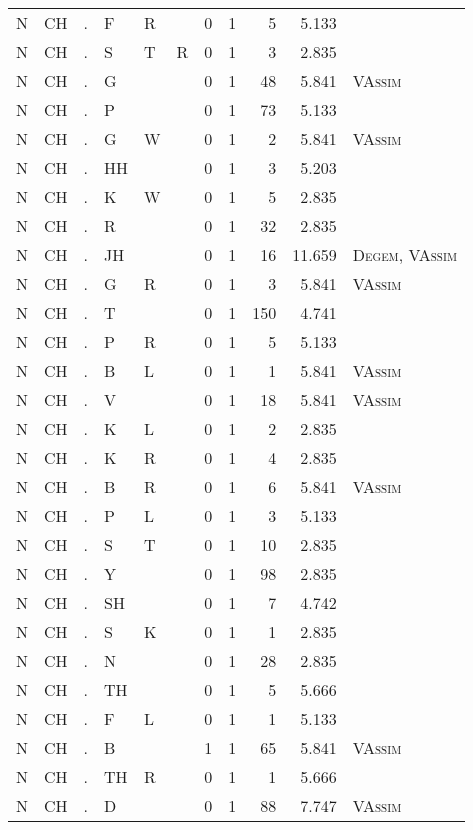 \begin{longtable}{r@{ } r@{ } c@{ } l@{ } l@{ } l@{ } r r r r l }
N & CH & . & F & R &  & 0 & 1 & 5 & 5.133 &  \\
N & CH & . & S & T & R & 0 & 1 & 3 & 2.835 &  \\
N & CH & . & G &  &  & 0 & 1 & 48 & 5.841 & \textsc{VAssim} \\
N & CH & . & P &  &  & 0 & 1 & 73 & 5.133 &  \\
N & CH & . & G & W &  & 0 & 1 & 2 & 5.841 & \textsc{VAssim} \\
N & CH & . & HH &  &  & 0 & 1 & 3 & 5.203 &  \\
N & CH & . & K & W &  & 0 & 1 & 5 & 2.835 &  \\
N & CH & . & R &  &  & 0 & 1 & 32 & 2.835 &  \\
N & CH & . & JH &  &  & 0 & 1 & 16 & 11.659 & \textsc{Degem}, \textsc{VAssim} \\
N & CH & . & G & R &  & 0 & 1 & 3 & 5.841 & \textsc{VAssim} \\
N & CH & . & T &  &  & 0 & 1 & 150 & 4.741 &  \\
N & CH & . & P & R &  & 0 & 1 & 5 & 5.133 &  \\
N & CH & . & B & L &  & 0 & 1 & 1 & 5.841 & \textsc{VAssim} \\
N & CH & . & V &  &  & 0 & 1 & 18 & 5.841 & \textsc{VAssim} \\
N & CH & . & K & L &  & 0 & 1 & 2 & 2.835 &  \\
N & CH & . & K & R &  & 0 & 1 & 4 & 2.835 &  \\
N & CH & . & B & R &  & 0 & 1 & 6 & 5.841 & \textsc{VAssim} \\
N & CH & . & P & L &  & 0 & 1 & 3 & 5.133 &  \\
N & CH & . & S & T &  & 0 & 1 & 10 & 2.835 &  \\
N & CH & . & Y &  &  & 0 & 1 & 98 & 2.835 &  \\
N & CH & . & SH &  &  & 0 & 1 & 7 & 4.742 &  \\
N & CH & . & S & K &  & 0 & 1 & 1 & 2.835 &  \\
N & CH & . & N &  &  & 0 & 1 & 28 & 2.835 &  \\
N & CH & . & TH &  &  & 0 & 1 & 5 & 5.666 &  \\
N & CH & . & F & L &  & 0 & 1 & 1 & 5.133 &  \\
N & CH & . & B &  &  & 1 & 1 & 65 & 5.841 & \textsc{VAssim} \\
N & CH & . & TH & R &  & 0 & 1 & 1 & 5.666 &  \\
N & CH & . & D &  &  & 0 & 1 & 88 & 7.747 & \textsc{VAssim} \\

\end{longtable}
